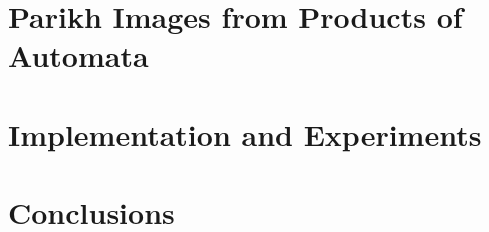 \documentclass[runningheads]{llncs}
\newif\ifoutline
\newcommand{\contents}[1]{\ifoutline{\color{blue}
    \begin{itemize}
    #1
    \end{itemize}
  }\fi}
\begin{document}
\contents{
\item Preliminaries, the underlying calculus, what are rules
\item Predicates used to represent Parikh images
\item Our calculus rules
\item Statement of properties, correctness, complexity
}

\section{Parikh Images from Products of Automata}

\contents{
\item additional rules needed for products
\item backjumping and conflict-driven learning
}

\section{Implementation and Experiments}

\contents{
\item length constraints
\item Parikh automata, automata with registers
\item Model-checking examples
}

\section{Conclusions}

\clearpage
%
%
\end{document}
